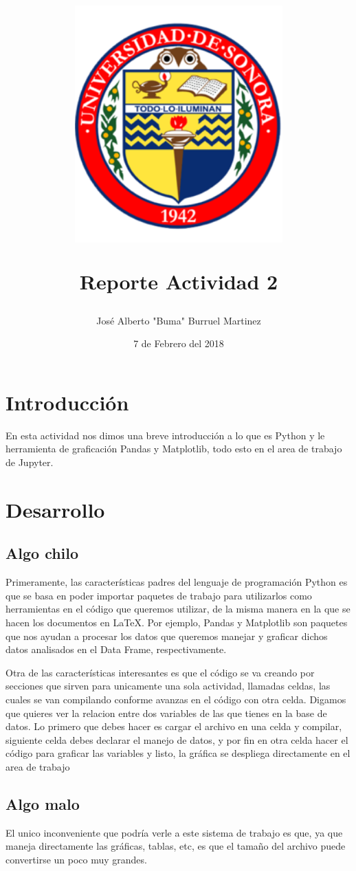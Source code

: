 \documentclass{article}
\title{
        \begin{center}
        \includegraphics[width=8cm]{Unison.png}
        \end{center}
        \newline
       Reporte Actividad 2}
\author{José Alberto "Buma" Burruel Martinez}
\date{7 de Febrero del 2018}
\begin{document}

\newpage

\section{Introducción}
En esta actividad nos dimos una breve introducción a lo que es Python y le herramienta de graficación Pandas y Matplotlib, todo esto en el area de trabajo de Jupyter.

\section{Desarrollo}
\subsection{Algo chilo}
Primeramente, las características padres del lenguaje de programación Python es que se basa en poder importar paquetes de trabajo para utilizarlos como herramientas en el código que queremos utilizar, de la misma manera en la que se hacen los documentos en \LaTeX . Por ejemplo, Pandas y Matplotlib son paquetes que nos ayudan a procesar los datos que queremos manejar y graficar dichos datos analisados en el Data Frame, respectivamente.


Otra de las características interesantes es que el código se va creando por secciones que sirven para unicamente una sola actividad, llamadas celdas, las cuales se van compilando conforme avanzas en el código con otra celda. Digamos que quieres ver la relacion entre dos variables de las que tienes en la base de datos. Lo primero que debes hacer es cargar el archivo en una celda y compilar, siguiente celda debes declarar el manejo de datos, y por fin en otra celda hacer el código para graficar las variables y listo, la gráfica se despliega directamente en el area de trabajo

\subsection{Algo malo}
El unico inconveniente que podría verle a este sistema de trabajo es que, ya que maneja directamente las gráficas, tablas, etc, es que el tamaño del archivo puede convertirse un poco muy grandes.
\end{document}
